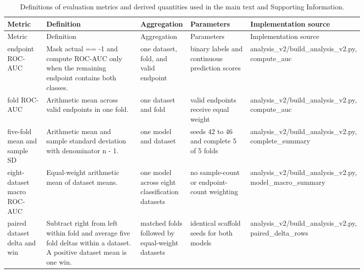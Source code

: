 \begin{landscape}
\begingroup
\scriptsize
\setlength{\tabcolsep}{3pt}
\renewcommand{\arraystretch}{0.96}
\begin{longtable}{
>{\raggedright\arraybackslash}p{0.11\linewidth}
>{\raggedright\arraybackslash}p{0.27\linewidth}
>{\raggedright\arraybackslash}p{0.14\linewidth}
>{\raggedright\arraybackslash}p{0.17\linewidth}
>{\raggedright\arraybackslash}p{0.15\linewidth}}
\caption{Definitions of evaluation metrics and derived quantities used in the main text and Supporting Information.}
\label{tab:si-metric-definitions}\\
\toprule
Metric & Definition & Aggregation & Parameters & Implementation source \\
\midrule
\endfirsthead
\toprule
Metric & Definition & Aggregation & Parameters & Implementation source \\
\midrule
\endhead
endpoint ROC-AUC & Mask actual == -1 and compute ROC-AUC only when the remaining endpoint contains both classes. & one dataset, fold, and valid endpoint & binary labels and continuous prediction scores & {\ttfamily\tiny analysis\_\allowbreak{}v2/\allowbreak{}build\_\allowbreak{}analysis\_\allowbreak{}v2.py,\allowbreak{} compute\_\allowbreak{}auc} \\
fold ROC-AUC & Arithmetic mean across valid endpoints in one fold. & one dataset and fold & valid endpoints receive equal weight & {\ttfamily\tiny analysis\_\allowbreak{}v2/\allowbreak{}build\_\allowbreak{}analysis\_\allowbreak{}v2.py,\allowbreak{} compute\_\allowbreak{}auc} \\
five-fold mean and sample SD & Arithmetic mean and sample standard deviation with denominator n - 1. & one model and dataset & seeds 42 to 46 and complete 5 of 5 folds & {\ttfamily\tiny analysis\_\allowbreak{}v2/\allowbreak{}build\_\allowbreak{}analysis\_\allowbreak{}v2.py,\allowbreak{} complete\_\allowbreak{}summary} \\
eight-dataset macro ROC-AUC & Equal-weight arithmetic mean of dataset means. & one model across eight classification datasets & no sample-count or endpoint-count weighting & {\ttfamily\tiny analysis\_\allowbreak{}v2/\allowbreak{}build\_\allowbreak{}analysis\_\allowbreak{}v2.py,\allowbreak{} model\_\allowbreak{}macro\_\allowbreak{}summary} \\
paired dataset delta and win & Subtract right from left within fold and average five fold deltas within a dataset. A positive dataset mean is one win. & matched folds followed by equal-weight datasets & identical scaffold seeds for both models & {\ttfamily\tiny analysis\_\allowbreak{}v2/\allowbreak{}build\_\allowbreak{}analysis\_\allowbreak{}v2.py,\allowbreak{} paired\_\allowbreak{}delta\_\allowbreak{}rows} \\

\end{longtable}
\end{landscape}
